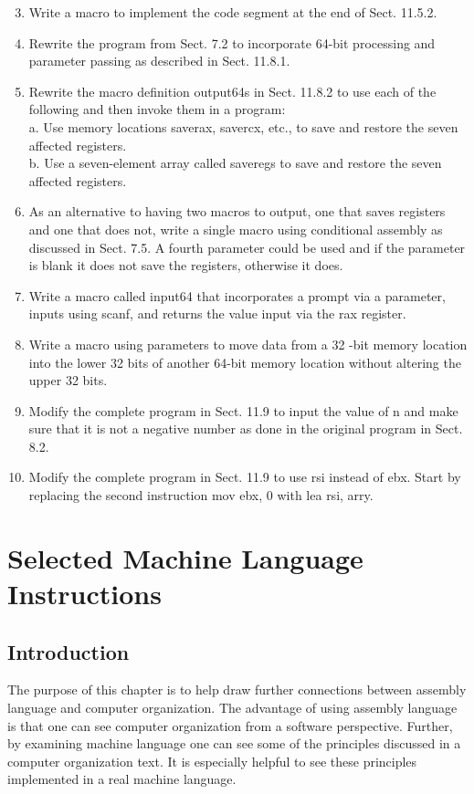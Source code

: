 \documentclass[10pt]{article}
\begin{document}
\begin{enumerate}
  \setcounter{enumi}{2}
  \item Write a macro to implement the code segment at the end of Sect. 11.5.2.
  \item Rewrite the program from Sect. 7.2 to incorporate 64-bit processing and parameter passing as described in Sect. 11.8.1.
  \item Rewrite the macro definition output64s in Sect. 11.8.2 to use each of the following and then invoke them in a program:\\
a. Use memory locations saverax, savercx, etc., to save and restore the seven affected registers.\\
b. Use a seven-element array called saveregs to save and restore the seven affected registers.
  \item As an alternative to having two macros to output, one that saves registers and one that does not, write a single macro using conditional assembly as discussed in Sect. 7.5. A fourth parameter could be used and if the parameter is blank it does not save the registers, otherwise it does.
  \item Write a macro called input64 that incorporates a prompt via a parameter, inputs using scanf, and returns the value input via the rax register.
  \item Write a macro using parameters to move data from a 32 -bit memory location into the lower 32 bits of another 64-bit memory location without altering the upper 32 bits.
  \item Modify the complete program in Sect. 11.9 to input the value of n and make sure that it is not a negative number as done in the original program in Sect. 8.2.
  \item Modify the complete program in Sect. 11.9 to use rsi instead of ebx. Start by replacing the second instruction mov ebx, 0 with lea rsi, arry.
\end{enumerate}

\section*{Selected Machine Language Instructions}
\subsection*{Introduction}
The purpose of this chapter is to help draw further connections between assembly language and computer organization. The advantage of using assembly language is that one can see computer organization from a software perspective. Further, by examining machine language one can see some of the principles discussed in a computer organization text. It is especially helpful to see these principles implemented in a real machine language.
\end{document}
